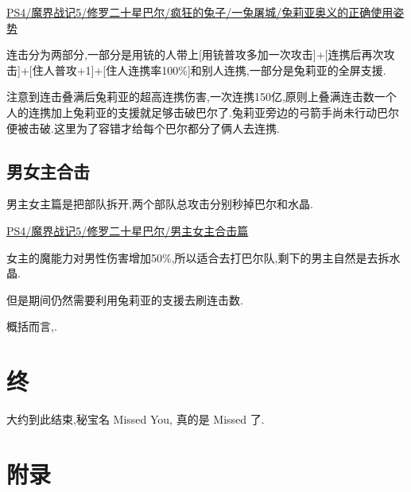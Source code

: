 	\href{http://www.bilibili.com/video/av2989748/}{PS4/魔界战记5/修罗二十星巴尔/疯狂的兔子/一兔屠城/兔莉亚奥义的正确使用姿势}


	连击分为两部分,一部分是用铳的人带上[用铳普攻多加一次攻击]+[连携后再次攻击]+[住人普攻+1]+[住人连携率100\%]和别人连携,一部分是兔莉亚的全屏支援.

	注意到连击叠满后兔莉亚的超高连携伤害,一次连携150亿,原则上叠满连击数一个人的连携加上兔莉亚的支援就足够击破巴尔了.兔莉亚旁边的弓箭手尚未行动巴尔便被击破.这里为了容错才给每个巴尔都分了俩人去连携.

	\subsection{男女主合击}
	男主女主篇是把部队拆开,两个部队总攻击分别秒掉巴尔和水晶.
	
	\href{http://www.bilibili.com/video/av2995573/}{PS4/魔界战记5/修罗二十星巴尔/男主女主合击篇}

	女主的魔能力对男性伤害增加50\%,所以适合去打巴尔队,剩下的男主自然是去拆水晶.

	但是期间仍然需要利用兔莉亚的支援去刷连击数.

	概括而言,{\color{red}{二十星是利用连击+部队总攻击}}.


	\newpage
	\section{终}
	大约到此结束,秘宝名 Missed You, 真的是 Missed 了.

	\newpage
	\section*{附录}

